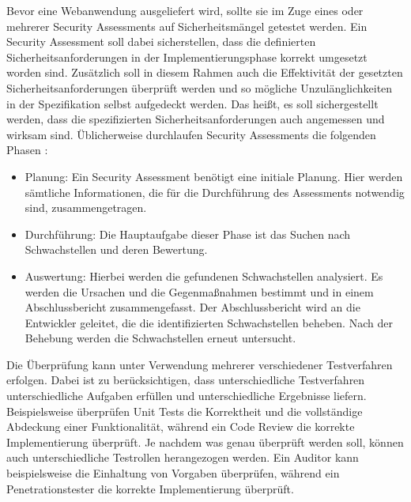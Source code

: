 \documentclass[12pt,oneside,a4paper,parskip]{scrbook}
\begin{document}
  Bevor eine Webanwendung ausgeliefert wird, sollte sie im Zuge eines oder mehrerer Security Assessments  auf Sicherheitsmängel getestet werden.
  Ein Security Assessment soll dabei sicherstellen, dass die definierten Sicherheitsanforderungen in der
  Implementierungsphase korrekt umgesetzt worden sind. Zusätzlich soll in diesem Rahmen auch die
  Effektivität der gesetzten Sicherheitsanforderungen überprüft werden und so mögliche Unzulänglichkeiten
  in der Spezifikation selbst aufgedeckt werden. Das heißt, es soll sichergestellt werden, dass die spezifizierten Sicherheitsanforderungen auch angemessen und wirksam sind.
  Üblicherweise durchlaufen Security Assessments die folgenden Phasen \cite{BSI}:
  \begin{itemize}
    \item Planung: Ein Security Assessment benötigt eine initiale Planung. Hier werden sämtliche
    Informationen, die für die Durchführung des Assessments notwendig sind, zusammengetragen.
    \item Durchführung: Die Hauptaufgabe dieser Phase ist das Suchen nach Schwachstellen und deren
    Bewertung.
    \item Auswertung: Hierbei werden die gefundenen Schwachstellen analysiert. Es werden die Ursachen
    und die Gegenmaßnahmen bestimmt und in einem Abschlussbericht zusammengefasst. Der
    Abschlussbericht wird an die Entwickler geleitet, die die identifizierten Schwachstellen beheben.
    Nach der Behebung werden die Schwachstellen erneut untersucht.
  \end{itemize}
  Die Überprüfung kann unter Verwendung mehrerer verschiedener Testverfahren erfolgen. Dabei ist zu
  berücksichtigen, dass unterschiedliche Testverfahren unterschiedliche Aufgaben erfüllen und
  unterschiedliche Ergebnisse liefern. Beispielsweise überprüfen Unit Tests die Korrektheit und die
  vollständige Abdeckung einer Funktionalität, während ein Code Review die korrekte Implementierung
  überprüft. Je nachdem was genau überprüft werden soll, können auch unterschiedliche Testrollen
  herangezogen werden. Ein Auditor kann beispielsweise die Einhaltung von Vorgaben überprüfen, während
  ein Penetrationstester die korrekte Implementierung überprüft.
\end{document}
